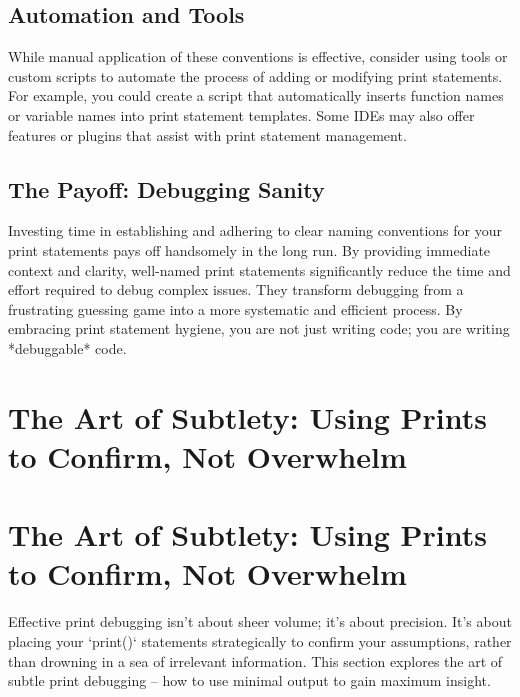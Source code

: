\documentclass{article}
\begin{document}
{{{\subsection*{Automation and Tools}

While manual application of these conventions is effective, consider using tools or custom scripts to automate the process of adding or modifying print statements.  For example, you could create a script that automatically inserts function names or variable names into print statement templates.  Some IDEs may also offer features or plugins that assist with print statement management.

\subsection*{The Payoff: Debugging Sanity}

Investing time in establishing and adhering to clear naming conventions for your print statements pays off handsomely in the long run. By providing immediate context and clarity, well-named print statements significantly reduce the time and effort required to debug complex issues. They transform debugging from a frustrating guessing game into a more systematic and efficient process. By embracing print statement hygiene, you are not just writing code; you are writing *debuggable* code.

\newpage

\section*{The Art of Subtlety: Using Prints to Confirm, Not Overwhelm} %
\label{chapter-4-10-The_Art_of_Subtlety__Using_Prints_to_Con}

\section*{The Art of Subtlety: Using Prints to Confirm, Not Overwhelm}

Effective print debugging isn't about sheer volume; it's about precision. It's about placing your `print()` statements strategically to confirm your assumptions, rather than drowning in a sea of irrelevant information. This section explores the art of subtle print debugging – how to use minimal output to gain maximum insight.

}}}
\end{document}
